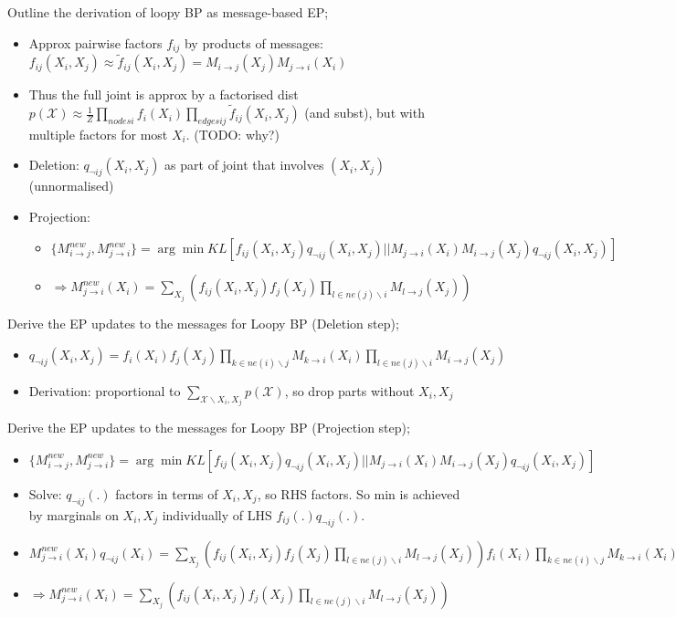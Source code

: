 \documentclass{article}
\begin{document}
Outline the derivation of loopy BP as message-based EP; \begin{itemize}
    \item Approx pairwise factors $f_{ij}$ by products of messages: $f_{ij}(X_i, X_j) \approx \tilde{f}_{ij}(X_i, X_j) = M_{i\rightarrow j}(X_j)M_{j\rightarrow i}(X_i)$
    \item Thus the full joint is approx by a factorised dist $p(\mathcal{X}) \approx \frac{1}{Z}\prod_{nodes i}f_i(X_i)\prod_{edges ij}\tilde{f}_{ij}(X_i, X_j)$ (and subst), but with multiple factors for most $X_i$. (TODO: why?)
    \item Deletion: $q_{\neg ij}(X_i, X_j)$ as part of joint that involves $(X_i, X_j)$ (unnormalised)
    \item Projection: \begin{itemize}
        \item $\{M^{new}_{i\rightarrow j}, M^{new}_{j \rightarrow i}\} = \arg\min KL[f_{ij}(X_i, X_j)q_{\neg ij}(X_i, X_j) || M_{j\rightarrow i}(X_i) M_{i\rightarrow j}(X_j)q_{\neg ij}(X_i, X_j)] $
    \item $\Rightarrow M_{j\rightarrow i}^{new}(X_i) = \sum_{X_j}(f_{ij}(X_i, X_j)f_j(X_j)\prod_{l\in ne(j)\backslash i}M_{l\rightarrow j}(X_j))$
    \end{itemize}
\end{itemize}

Derive the EP updates to the messages for Loopy BP (Deletion step); \begin{itemize}
    \item $q_{\neg ij}(X_i, X_j) = f_i(X_i)f_j(X_j)\prod_{k\in ne(i)\backslash j}M_{k\rightarrow i}(X_i)\prod_{l\in ne(j)\backslash i}M_{i\rightarrow j}(X_j)$
    \item Derivation: proportional to $\sum_{\mathcal{X}\backslash X_i, X_j}p(\mathcal{X})$, so drop parts without $X_i, X_j$
\end{itemize}

Derive the EP updates to the messages for Loopy BP (Projection step); \begin{itemize}
    \item $\{M^{new}_{i\rightarrow j}, M^{new}_{j \rightarrow i}\} = \arg\min KL[f_{ij}(X_i, X_j)q_{\neg ij}(X_i, X_j) || M_{j\rightarrow i}(X_i) M_{i\rightarrow j}(X_j)q_{\neg ij}(X_i, X_j)] $
    \item Solve: $q_{\neg ij}(.)$ factors in terms of $X_i, X_j$, so RHS factors. So min is achieved by marginals on $X_i, X_j$ individually of LHS $f_{ij}(.)q_{\neg ij}(.)$.
    \item $M_{j\rightarrow i}^{new}(X_i)q_{\neg ij}(X_i) = \sum_{X_j}(f_{ij}(X_i, X_j)f_j(X_j)\prod_{l\in ne(j)\backslash i}M_{l\rightarrow j}(X_j)) f_i(X_i) \prod_{k\in ne(i) \backslash j}M_{k\rightarrow i}(X_i)$ 
    \item $\Rightarrow M_{j\rightarrow i}^{new}(X_i) = \sum_{X_j}(f_{ij}(X_i, X_j)f_j(X_j)\prod_{l\in ne(j)\backslash i}M_{l\rightarrow j}(X_j))$
\end{itemize}
\end{document}
